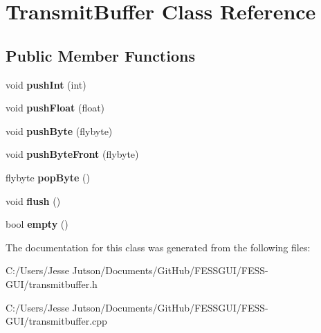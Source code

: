 \hypertarget{class_transmit_buffer}{}\section{Transmit\+Buffer Class Reference}
\label{class_transmit_buffer}
\subsection*{Public Member Functions}
\begin{DoxyCompactItemize}
\item 
\hypertarget{class_transmit_buffer_aedb208968c943ed3913ebb92bdd8d503}{}\label{class_transmit_buffer_aedb208968c943ed3913ebb92bdd8d503} 
void {\bfseries push\+Int} (int)
\item 
\hypertarget{class_transmit_buffer_ad6f2bf1d6851b298590cd002fb62d8c4}{}\label{class_transmit_buffer_ad6f2bf1d6851b298590cd002fb62d8c4} 
void {\bfseries push\+Float} (float)
\item 
\hypertarget{class_transmit_buffer_a9b60d63a662ff83c8d5d03cd6646628e}{}\label{class_transmit_buffer_a9b60d63a662ff83c8d5d03cd6646628e} 
void {\bfseries push\+Byte} (flybyte)
\item 
\hypertarget{class_transmit_buffer_a2390bed50bee25863d62b88f99df3c16}{}\label{class_transmit_buffer_a2390bed50bee25863d62b88f99df3c16} 
void {\bfseries push\+Byte\+Front} (flybyte)
\item 
\hypertarget{class_transmit_buffer_ae69cb23f10c0d0e053bae6f5812bcd04}{}\label{class_transmit_buffer_ae69cb23f10c0d0e053bae6f5812bcd04} 
flybyte {\bfseries pop\+Byte} ()
\item 
\hypertarget{class_transmit_buffer_a574f5ab5eca07b5ee8a517812cd7d87a}{}\label{class_transmit_buffer_a574f5ab5eca07b5ee8a517812cd7d87a} 
void {\bfseries flush} ()
\item 
\hypertarget{class_transmit_buffer_af3396e1989bd10f06bc9d8fd8b810da4}{}\label{class_transmit_buffer_af3396e1989bd10f06bc9d8fd8b810da4} 
bool {\bfseries empty} ()
\end{DoxyCompactItemize}


The documentation for this class was generated from the following files\+:\begin{DoxyCompactItemize}
\item 
C\+:/\+Users/\+Jesse Jutson/\+Documents/\+Git\+Hub/\+F\+E\+S\+S\+G\+U\+I/\+F\+E\+S\+S-\/\+G\+U\+I/transmitbuffer.\+h\item 
C\+:/\+Users/\+Jesse Jutson/\+Documents/\+Git\+Hub/\+F\+E\+S\+S\+G\+U\+I/\+F\+E\+S\+S-\/\+G\+U\+I/transmitbuffer.\+cpp\end{DoxyCompactItemize}
